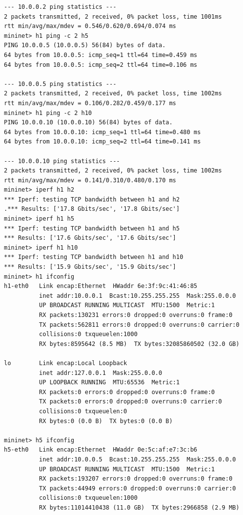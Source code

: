 \documentclass[a4paper, 11pt]{article}
\begin{document}
\begin{appendices}
\begin{lstlisting}[style=BashInputStyle]
--- 10.0.0.2 ping statistics ---
2 packets transmitted, 2 received, 0% packet loss, time 1001ms
rtt min/avg/max/mdev = 0.546/0.620/0.694/0.074 ms
mininet> h1 ping -c 2 h5
PING 10.0.0.5 (10.0.0.5) 56(84) bytes of data.
64 bytes from 10.0.0.5: icmp_seq=1 ttl=64 time=0.459 ms
64 bytes from 10.0.0.5: icmp_seq=2 ttl=64 time=0.106 ms

--- 10.0.0.5 ping statistics ---
2 packets transmitted, 2 received, 0% packet loss, time 1002ms
rtt min/avg/max/mdev = 0.106/0.282/0.459/0.177 ms
mininet> h1 ping -c 2 h10
PING 10.0.0.10 (10.0.0.10) 56(84) bytes of data.
64 bytes from 10.0.0.10: icmp_seq=1 ttl=64 time=0.480 ms
64 bytes from 10.0.0.10: icmp_seq=2 ttl=64 time=0.141 ms

--- 10.0.0.10 ping statistics ---
2 packets transmitted, 2 received, 0% packet loss, time 1002ms
rtt min/avg/max/mdev = 0.141/0.310/0.480/0.170 ms
mininet> iperf h1 h2
*** Iperf: testing TCP bandwidth between h1 and h2
.*** Results: ['17.8 Gbits/sec', '17.8 Gbits/sec']
mininet> iperf h1 h5
*** Iperf: testing TCP bandwidth between h1 and h5
*** Results: ['17.6 Gbits/sec', '17.6 Gbits/sec']
mininet> iperf h1 h10
*** Iperf: testing TCP bandwidth between h1 and h10
*** Results: ['15.9 Gbits/sec', '15.9 Gbits/sec']
mininet> h1 ifconfig
h1-eth0   Link encap:Ethernet  HWaddr 6e:3f:9c:41:46:85
          inet addr:10.0.0.1  Bcast:10.255.255.255  Mask:255.0.0.0
          UP BROADCAST RUNNING MULTICAST  MTU:1500  Metric:1
          RX packets:130231 errors:0 dropped:0 overruns:0 frame:0
          TX packets:562811 errors:0 dropped:0 overruns:0 carrier:0
          collisions:0 txqueuelen:1000
          RX bytes:8595642 (8.5 MB)  TX bytes:32085860502 (32.0 GB)

lo        Link encap:Local Loopback
          inet addr:127.0.0.1  Mask:255.0.0.0
          UP LOOPBACK RUNNING  MTU:65536  Metric:1
          RX packets:0 errors:0 dropped:0 overruns:0 frame:0
          TX packets:0 errors:0 dropped:0 overruns:0 carrier:0
          collisions:0 txqueuelen:0
          RX bytes:0 (0.0 B)  TX bytes:0 (0.0 B)

mininet> h5 ifconfig
h5-eth0   Link encap:Ethernet  HWaddr 0e:5c:af:e7:3c:b6
          inet addr:10.0.0.5  Bcast:10.255.255.255  Mask:255.0.0.0
          UP BROADCAST RUNNING MULTICAST  MTU:1500  Metric:1
          RX packets:193207 errors:0 dropped:0 overruns:0 frame:0
          TX packets:44949 errors:0 dropped:0 overruns:0 carrier:0
          collisions:0 txqueuelen:1000
          RX bytes:11014410438 (11.0 GB)  TX bytes:2966858 (2.9 MB)


\end{lstlisting}
\end{appendices}
\end{document}
